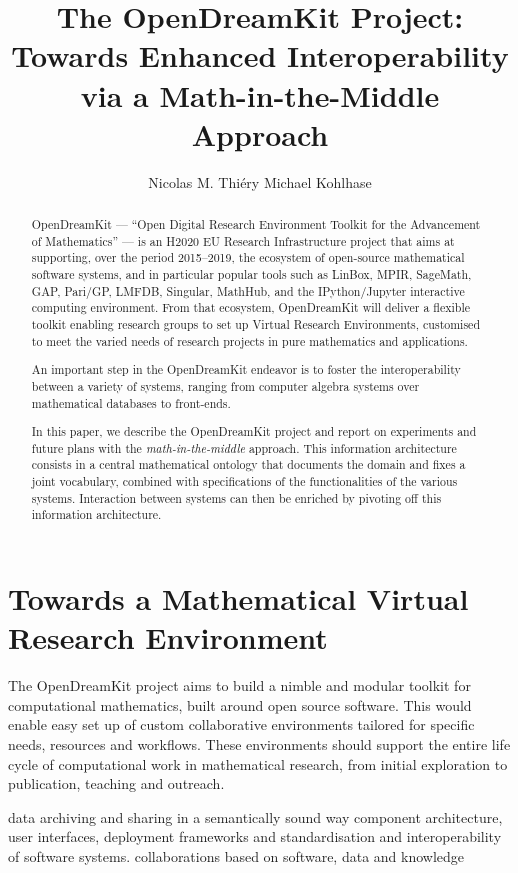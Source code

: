 \documentclass{llncs}
\title{The OpenDreamKit Project:\\
  Towards Enhanced Interoperability\\
  via a Math-in-the-Middle Approach}
\author{Nicolas M. Thi\'ery\inst{1} Michael Kohlhase\inst{2}}
\institute{Universit\'e Paris-Sud, Paris, France\and
Jacobs University, Bremen, Germany}
\begin{document}
\maketitle
\begin{abstract}
  OpenDreamKit --- ``Open Digital Research Environment Toolkit for the
  Advancement of Mathematics'' --- is an H2020 EU Research
  Infrastructure project that aims at supporting, over the period
  2015--2019, the ecosystem of open-source mathematical software
  systems, and in particular popular tools such as LinBox, MPIR,
  SageMath, GAP, Pari/GP, LMFDB, Singular, MathHub, and the
  IPython/Jupyter interactive computing environment. From that
  ecosystem, OpenDreamKit will deliver a flexible toolkit enabling
  research groups to set up Virtual Research Environments, customised
  to meet the varied needs of research projects in pure mathematics
  and applications.

  An important step in the OpenDreamKit endeavor is to foster the
  interoperability between a variety of systems, ranging from computer
  algebra systems over mathematical databases to front-ends.

  In this paper, we describe the OpenDreamKit project and report on experiments and future
  plans with the \emph{math-in-the-middle} approach.  This information architecture
  consists in a central mathematical ontology that documents the domain and fixes a joint
  vocabulary, combined with specifications of the functionalities of the various
  systems. Interaction between systems can then be enriched by pivoting off this
  information architecture.
\end{abstract}

\section{Towards a Mathematical Virtual Research Environment}
The OpenDreamKit project aims to build a nimble and modular toolkit for computational
mathematics, built around open source software. This would enable easy set up of custom
collaborative environments tailored for specific needs, resources and workflows. These
environments should support the entire life cycle of computational work in mathematical
research, from initial exploration to publication, teaching and outreach.

data archiving and sharing in a semantically sound way component architecture, user
interfaces, deployment frameworks and standardisation and interoperability of software
systems.  collaborations based on software, data and knowledge
\end{document}
